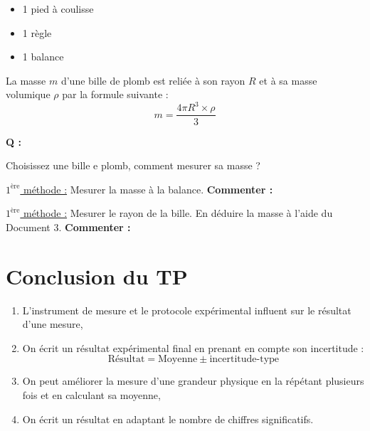 \begin{mdframed}[style=autreexo]
\textbf{}
\begin{itemize}
    \item 1 pied à coulisse
    \item 1 règle
    \item 1 balance
\end{itemize}
\end{mdframed}

\begin{tcolorbox}[colback=blue!5!white,colframe=white!75!black,title=Document 3 :]La masse $m$ d'une bille de plomb est reliée à son rayon $R$ et à sa masse volumique $\rho$ par la formule suivante :
\begin{equation*}
    m = \frac{4\pi R^3\times\rho}{3}
\end{equation*}
\end{tcolorbox}

\begin{Large}{\textbf{Q :}} \end{Large} Choisissez une bille e plomb, comment mesurer sa masse ? 
\newline
\newline

\underline{$1^{\text{ère}}$ méthode :} Mesurer la masse à la balance. \textbf{Commenter :}
\vspace{5cm}

\underline{$1^{\text{ère}}$ méthode :} Mesurer le rayon de la bille. En déduire la masse à l'aide du Document 3. \textbf{Commenter :}


\newpage

\section*{Conclusion du TP}

\begin{tcolorbox}[colback=red!5!white,colframe=red!75!black,title=\textbf{On retiendra : }]
\begin{enumerate}
    \item L'instrument de mesure et le protocole expérimental influent sur le résultat d'une mesure,
    \item On écrit un résultat expérimental final en prenant en compte son incertitude :
    \begin{equation*}
        \text{Résultat} = \text{Moyenne} \pm \text{incertitude-type}
    \end{equation*}
    \item On peut améliorer la mesure d'une grandeur physique en la répétant plusieurs fois et en calculant sa moyenne,
    \item On écrit un résultat en adaptant le nombre de chiffres significatifs.
\end{enumerate}
\end{tcolorbox}
